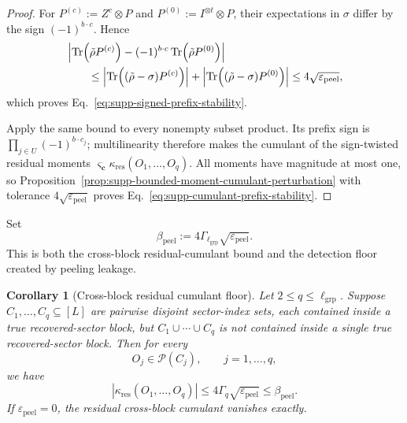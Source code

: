 \documentclass[
  aps,
  prx,
  reprint,
  superscriptaddress,
  amsmath,
  amssymb,
  nofootinbib,
  longbibliography
]{revtex4-2}
\newtheorem{corollary}[theorem]{Corollary}
\begin{document}
\begin{proof}
For $P^{(c)}:=Z^c\otimes P$ and
$P^{(0)}:=I^{\otimes t}\otimes P$, their expectations in $\sigma$ differ
by the sign $(-1)^{b\cdot c}$.  Hence
\begin{align*}
&
\left|
\Tr(\tilde\rho P^{(c)})
-
(-1)^{b\cdot c}\Tr(\tilde\rho P^{(0)})
\right| \\
&\qquad\le
\left|\Tr((\tilde\rho-\sigma)P^{(c)})\right|
+
\left|\Tr((\tilde\rho-\sigma)P^{(0)})\right|
\le
4\sqrt{\varepsilon_{\mathrm{peel}}},
\end{align*}
which proves Eq.~\eqref{eq:supp-signed-prefix-stability}.

Apply the same bound to every nonempty subset product.  Its prefix sign is
$\prod_{j\in U}(-1)^{b\cdot c_j}$; multilinearity therefore makes the
cumulant of the sign-twisted residual moments
$\varsigma_{\mathbf c}\kappa_{\mathrm{res}}(O_1,\dots,O_q)$.
All moments have magnitude at most one, so
Proposition~\ref{prop:supp-bounded-moment-cumulant-perturbation} with
tolerance $4\sqrt{\varepsilon_{\mathrm{peel}}}$ proves
Eq.~\eqref{eq:supp-cumulant-prefix-stability}.
\end{proof}

Set
\begin{equation}
\beta_{\mathrm{peel}}
:=
4\Gamma_{\ell_{\mathrm{grp}}}
\sqrt{\varepsilon_{\mathrm{peel}}}.
\label{eq:supp-beta-peel-cumulants}
\end{equation}
This is both the cross-block residual-cumulant bound and the detection floor
created by peeling leakage.

\begin{corollary}[Cross-block residual cumulant floor]
\label{cor:supp-cross-block-cumulant-floor}
Let $2\le q\le\ell_{\mathrm{grp}}$.  Suppose
$C_1,\dots,C_q\subseteq[L]$ are pairwise disjoint sector-index sets, each
contained inside a true recovered-sector block, but
$C_1\cup\cdots\cup C_q$ is not contained inside a single true
recovered-sector block.  Then for every
\begin{equation}
O_j\in\mathcal P(C_j),
\qquad j=1,\dots,q,
\end{equation}
we have
\begin{equation}
\left|
\kappa_{\mathrm{res}}(O_1,\dots,O_q)
\right|
\le
4\Gamma_q\sqrt{\varepsilon_{\mathrm{peel}}}
\le
\beta_{\mathrm{peel}}.
\label{eq:supp-cross-block-cumulant-floor}
\end{equation}
If $\varepsilon_{\mathrm{peel}}=0$, the residual cross-block cumulant
vanishes exactly.
\end{corollary}
\end{document}
